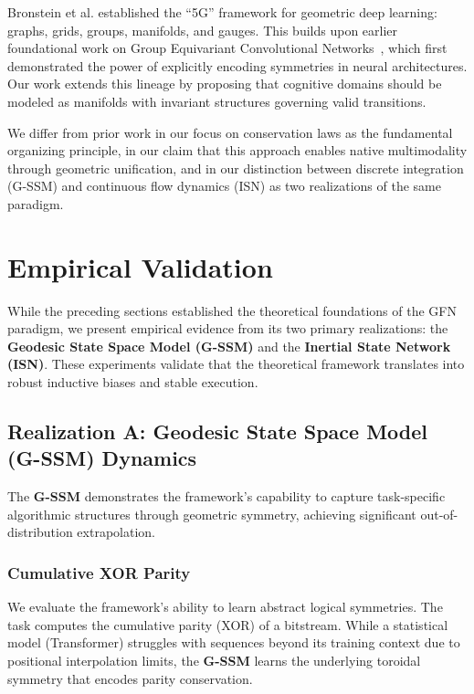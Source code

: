 \documentclass[12pt,a4paper]{article}
\begin{document}
Bronstein et al. \cite{bronstein2017, bronstein2021} established the ``5G'' framework for geometric deep learning: graphs, grids, groups, manifolds, and gauges. This builds upon earlier foundational work on Group Equivariant Convolutional Networks~\cite{cohen2016}, which first demonstrated the power of explicitly encoding symmetries in neural architectures. Our work extends this lineage by proposing that cognitive domains should be modeled as manifolds with invariant structures governing valid transitions.

We differ from prior work in our focus on conservation laws as the fundamental organizing principle, in our claim that this approach enables native multimodality through geometric unification, and in our distinction between discrete integration (G-SSM) and continuous flow dynamics (ISN) as two realizations of the same paradigm.

\section{Empirical Validation}
\label{sec:empirical-validation}

While the preceding sections established the theoretical foundations of the GFN paradigm, we present empirical evidence from its two primary realizations: the \textbf{Geodesic State Space Model (G-SSM)} and the \textbf{Inertial State Network (ISN)}. These experiments validate that the theoretical framework translates into robust inductive biases and stable execution.

\subsection{Realization A: Geodesic State Space Model (G-SSM) Dynamics}
\label{sec:gfn-experiments}

The \textbf{G-SSM} demonstrates the framework's capability to capture task-specific algorithmic structures through geometric symmetry, achieving significant out-of-distribution extrapolation.

\subsubsection{Cumulative XOR Parity}
\label{sec:xor-experiment}

We evaluate the framework's ability to learn abstract logical symmetries. The task computes the cumulative parity (XOR) of a bitstream. While a statistical model (Transformer) struggles with sequences beyond its training context due to positional interpolation limits, the \textbf{G-SSM} learns the underlying toroidal symmetry that encodes parity conservation.
\end{document}
